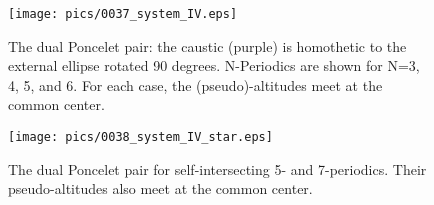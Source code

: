 \begin{figure}
    \centering
\texttt{[image: pics/0037\_system\_IV.eps]}
    \caption{The dual Poncelet pair: the caustic (purple) is homothetic to the external ellipse rotated 90 degrees. N-Periodics are shown for N=3, 4, 5, and 6. For each case, the (pseudo)-altitudes meet at the common center.}
    \label{fig:dual}
\end{figure}

\begin{figure}
    \centering
\texttt{[image: pics/0038\_system\_IV\_star.eps]}
    \caption{The dual Poncelet pair for self-intersecting 5- and 7-periodics. Their pseudo-altitudes also meet at the common center.}
    \label{fig:dual-star}
\end{figure}